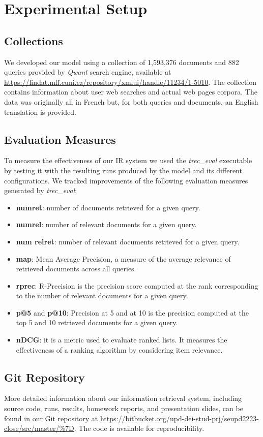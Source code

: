 
\section{Experimental Setup}
\label{sec:setup}

\subsection{Collections}
We developed our model using a collection of 1,593,376 documents and 882 queries provided by \textit{Qwant} search engine, available at \url{https://lindat.mff.cuni.cz/repository/xmlui/handle/11234/1-5010}.
\newline
The collection contains information about user web searches and actual web pages corpora. The data was originally all in French but, for both queries and documents, an English translation is provided.


\subsection{Evaluation Measures}
To measure the effectiveness of our \ac{IR} system we used the \textit{trec\_eval} executable by testing it with the resulting runs produced by the model and its different configurations.
\newline
We tracked improvements of the following evaluation measures generated by \textit{trec\_eval}:
\begin{itemize}
	\item \textbf{num\textunderscore ret}: number of documents retrieved for a given query.
	\item \textbf{num\textunderscore rel}: number of relevant documents for a given query.
	\item \textbf{num \textunderscore rel\textunderscore ret}: number of relevant documents retrieved for a given query.
    \item \textbf{map}: Mean Average Precision, a measure of the average relevance of retrieved documents across all queries. 
    \item \textbf{rprec}: R-Precision is the precision score computed at the rank corresponding to the number of relevant documents for a given query.
    \item \textbf{p@5} and \textbf{p@10}: Precision at 5 and at 10 is the precision computed at the top 5 and 10 retrieved documents for a given query.
    \item \textbf{nDCG}: it is a metric used to evaluate ranked lists. It measures the effectiveness of a ranking algorithm by considering item relevance.
\end{itemize}


\subsection{Git Repository}
More detailed information about our information retrieval system, including source code, runs, results, homework reports, and presentation slides, can be found in our Git repository at \url{https://bitbucket.org/upd-dei-stud-prj/seupd2223-close/src/master/%7D}. 
The code is available for reproducibility.